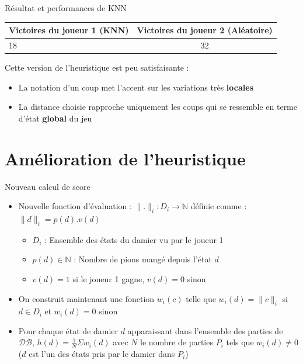 \documentclass{beamer}
\begin{document}
\begin{frame}{Résultat et performances de KNN}
    \begin{center}
        \begin{tabular}{ | l | c | }
            \hline
            Victoires du joueur 1 (KNN) & Victoires du joueur 2 (Aléatoire) \\ \hline
            18                          & 32                                \\ \hline
        \end{tabular}
    \end{center}
    Cette version de l'heuristique est peu satisfaisante :
    \begin{itemize}
        \item La notation d'un coup met l'accent sur les variations très \textbf{locales}
        \item La distance choisie rapproche uniquement les coups qui se ressemble en terme d'état \textbf{global} du jeu
    \end{itemize}
\end{frame}

{\section{Amélioration de l'heuristique}}

\begin{frame}{Nouveau calcul de score}
    \begin{itemize}
        \item Nouvelle fonction d'évaluation : \newline
              $\lVert.\rVert_i : D_i \to \mathbb{N}$ définie comme : $\lVert d \rVert_i = p(d).v(d)$
              \begin{itemize}
                  \item $D_i$ : Ensemble des états du damier vu par le joueur 1
                  \item $p(d) \in \mathbb{N}$ : Nombre de pions mangé depuis l'état $d$
                  \item  $v(d) = 1$ si le joueur 1 gagne, $v(d) = 0$ sinon
              \end{itemize}
        \item On construit maintenant une fonction $w_i(c)$ telle que $w_i(d) = \lVert c \lVert_i$ si $d \in D_i$ et $w_i(d) = 0$ sinon
        \item Pour chaque état de damier $d$ apparaissant dans l'ensemble des parties de $\mathcal{DB}$, $h(d) = \frac{1}{N}\Sigma w_i(d)$ avec $N$ le nombre de parties $P_i$ tels que $w_i(d) \neq 0$ ($d$ est l'un des états pris par le damier dans $P_i$)
    \end{itemize}
\end{frame}
\end{document}
